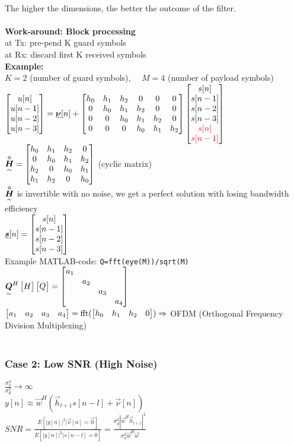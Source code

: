 \begin{doublespace}
{}\\
The higher the dimensions, the better the outcome of the filter. \\ \ \\
\textbf{Work-around: Block processing}\\
at Tx: pre-pend K guard symbols\\
at Rx: discard first K received symbols\\
\textbf{Example:}\\
$K=2$ (number of \textcolor[rgb]{1,0,0}{guard symbols}), $\quad M=4$ (number of payload symbols)\\
$\mat{u[n]\\u[n-1]\\u[n-2]\\u[n-3]}=\vec{\nu}[n] + \mat{h_0&h_1&h_2&0&0&0\\ 0&h_0&h_1&h_2&0&0\\ 0&0&h_0&h_1&h_2&0\\ 0&0&0&h_0&h_1&h_2}\mat{s[n]\\s[n-1]\\s[n-2]\\s[n-3]\\\textcolor[rgb]{1,0,0}{s[n]}\\\textcolor[rgb]{1,0,0}{s[n-1]}}$\\
$\underset{\sim}{\boldsymbol {\overset{\circ}{H}}}=\begin{bmatrix} h_0&h_1&h_2&0\\ 0&h_0&h_1&h_2\\ h_2&0&h_0&h_1\\ h_1&h_2&0&h_0 \end{bmatrix}$ (cyclic matrix)\\
$\underset{\sim}{\boldsymbol {\overset{\circ}{H}}}$ is invertible \pfeil with no noise, we get a perfect solution with losing bandwidth efficiency\\
$\underline{\boldsymbol {s}}[n] = \begin{bmatrix} s[n]\\s[n-1]\\s[n-2]\\s[n-3] \end{bmatrix}$\\
Example MATLAB-code: \lstinline !Q=fft(eye(M))/sqrt(M)!\\
$\underset{\sim}{\boldsymbol {Q}}^H\begin{bmatrix} H \end{bmatrix}\begin{bmatrix} Q \end{bmatrix}=\begin{bmatrix} a_1& & & \\ &a_2& & \\ & &a_3& \\ & & &a_4 \end{bmatrix}$\\
$\begin{bmatrix} a_1&a_2&a_3&a_4 \end{bmatrix}=\text{fft}(\begin{bmatrix} h_0&h_1&h_2&0 \end{bmatrix}) \Rightarrow$ OFDM (Orthogonal Frequency Division Multiplexing)\\ \ \\

\subsubsection{Case 2: Low SNR (High Noise)}
$\frac{\sigma_\nu^2}{\sigma_d^2}\rightarrow\infty$\\
$y[n]\approx\vec{w}^H(\vec{h}_{l+1}s[n-l]+\vec{\nu}[n])$\\
$SNR=\frac{E[|y[n]|^2|\vec{\nu}[n]=\vec{0}]}{E[|y[n]|^2|s[n-l]=0]} = \frac{\sigma_d^2|\vec{w}^H\vec{h}_{l+1}|^2}{\sigma_\nu^2\vec{w}^H\vec{w}}$\\


\end{doublespace}
